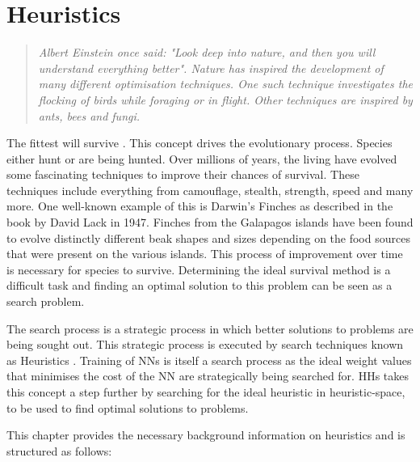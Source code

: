 \chapter{Heuristics}
\label{chap:heuristics}



\begin{quote}
\it {
  Albert Einstein once said: "Look deep into nature, and then you will understand everything better". Nature has inspired the development of many different optimisation techniques. One such technique investigates the flocking of birds while foraging or in flight. Other techniques are inspired by ants, bees and fungi. 
}
\end{quote}


The fittest will survive \cite[p.~444]{ref:spencer:1864}. This concept drives the evolutionary process. Species either hunt or are being hunted. Over millions of years, the living have evolved some fascinating techniques to improve their chances of survival. These techniques include everything from camouflage, stealth, strength, speed and many more. One well-known example of this is Darwin's Finches as described in the book by David Lack \cite{ref:lack:1983} in 1947. Finches from the Galapagos islands have been found to evolve distinctly different beak shapes and sizes depending on the food sources that were present on the various islands. This process of improvement over time is necessary for species to survive. Determining the ideal survival method is a difficult task and finding an optimal solution to this problem can be seen as a search problem. 

The search process is a strategic process in which better solutions to problems are being sought out. This strategic process is executed by search techniques known as Heuristics . Training of NNs is itself a search process as the ideal weight values that minimises the cost of the NN are strategically being searched for. HHs takes this concept a step further by searching for the ideal heuristic in heuristic-space, to be used to find optimal solutions to problems.

This chapter provides the necessary background information on heuristics and is structured as follows:


